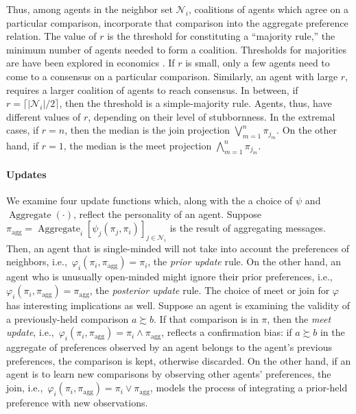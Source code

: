 \documentclass[conference]{ieeeconf}
\newcommand{\N}{\mathcal{N}}
\newcommand{\prefers}{\succsim}
\newcommand{\join}{\vee}
\newcommand{\meet}{\wedge}
\newcommand{\bigjoin}{\bigvee}
\newcommand{\bigmeet}{\bigwedge}
\DeclareMathOperator{\Aggregate}{Aggregate}
\DeclareMathOperator{\Median}{Median}
\begin{document}

Thus, among agents in the neighbor set $\N_i$, coalitions of agents which agree on a particular comparison, incorporate that comparison into the aggregate preference relation. The value of $r$ is the threshold for constituting a ``majority rule,'' the minimum number of agents needed to form a coalition. Thresholds for majorities are have been explored in economics \cite{buchanan1965calculus}. If $r$ is small, only a few agents need to come to a consensus on a particular comparison. Similarly, an agent with large $r$, requires a larger coalition of agents to reach consensus. In between, if $r = \lceil |\N_i|/2 \rceil$, then the threshold is a simple-majority rule. Agents, thus, have different values of $r$, depending on their level of stubbornness. In the extremal cases, if $r= n$, then the median is the join projection $\bigjoin_{m=1}^n \pi_{j_m}$. On the other hand, if $r=1$, the median is the meet projection $\bigmeet_{m=1}^n \pi_{j_m}$. 

\paragraph{Updates}
We examine four update functions which, along with the a choice of $\psi$ and $\Aggregate(\cdot)$, reflect the personality of an agent. Suppose $\pi_{\mathrm{agg}} = \Aggregate_i\left[\psi_j(\pi_j,\pi_i)\right]_{j \in \N_i}$ is the result of aggregating messages. Then, an agent that is single-minded will not take into account the preferences of neighbors, i.e.,~$\varphi_i(\pi_i,\pi_{\mathrm{agg}}) = \pi_i$, the \emph{prior update} rule. On the other hand, an agent who is unusually open-minded might ignore their prior preferences, i.e.,~$\varphi_i(\pi_i,\pi_{\mathrm{agg}}) = \pi_{\mathrm{agg}}$, the \emph{posterior update} rule. The choice of meet or join for $\varphi$ has interesting implications as well. Suppose an agent is examining the validity of a previously-held comparison $a \prefers b$. If that comparison is in $\pi$, then the \emph{meet update}, i.e.,~$\varphi_i(\pi_i,\pi_{\mathrm{agg}}) = \pi_i \meet \pi_{\mathrm{agg}}$, reflects a confirmation bias: if $a \prefers b$ in the aggregate of preferences observed by an agent belongs to the agent's previous preferences, the comparison is kept, otherwise discarded. On the other hand, if an agent is to learn new comparisons by observing other agents' preferences, the join, i.e.,~$\varphi_i(\pi_i,\pi_{\mathrm{agg}}) = \pi_i \join \pi_{\mathrm{agg}}$, models the process of integrating a prior-held preference with new observations.
\end{document}
